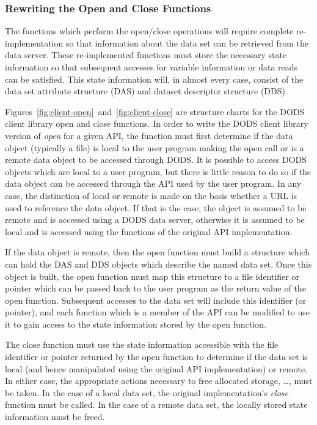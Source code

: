 \subsubsection{Rewriting the Open and Close Functions}
\label{ddd:client-lib-open}

The functions which perform the open/close operations will require complete
re-implementation so that information about the data set can be retrieved
from the data server. These re-implemented functions must store the necessary
state information so that subsequent accesses for variable information or
data reads can be satisfied. This state information will, in almost every
case, consist of the data set attribute structure (DAS) and dataset
descriptor structure (DDS).

Figures~\ref{fig:client-open}~and~\ref{fig:client-close} are structure charts
for the DODS client library open and close functions. In order to write the
DODS client library version of {\em open\/} for a given API, the function
must first determine if the data object (typically a file) is local to the
user program making the open call or is a remote data object to be accessed
through DODS\@. It is possible to access DODS objects which are local to a user
program, but there is little reason to do so if the data object can be
accessed through the API used by the user program. In any case, the
distinction of local or remote is made on the basis whether a URL is used to
reference the data object. If that is the case, the object is assumed to be
remote and is accessed using a DODS data server, otherwise it is assumed to
be local and is accessed using the functions of the original API
implementation.

If the data object is remote, then the open function must build a structure
which can hold the DAS and DDS objects which describe the named data
set. Once this object is built, the open function must map this structure to
a file identifier or pointer which can be passed back to the user program as
the return value of the open function. Subsequent accesses to the data set
will include this identifier (or pointer), and each function which is a
member of the API can be modified to use it to gain access to the state
information stored by the open function.

The close function must use the state information accessible with the file
identifier or pointer returned by the open function to determine if the data
set is local (and hence manipulated using the original API implementation) or
remote. In either case, the appropriate actions necessary to free allocated
storage, \ldots, must be taken. In the case of a local data set, the original
implementation's {\em close\/} function must be called. In the case of a remote
data set, the locally stored state information must be freed.

